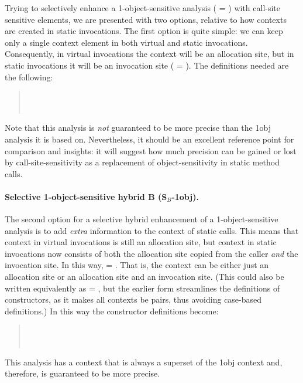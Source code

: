 Trying to selectively enhance a 1-object-sensitive analysis (
= \args{\{$\star$\}}) with call-site sensitive elements, we are
presented with two options, relative to how contexts are created in
static invocations. The first option is quite simple: we can keep only
a single context element in both virtual and static
invocations. Consequently, in virtual invocations the context will be
an allocation site, but in static invocations it will be an invocation
site ( = ). The definitions needed are the
following:
\begin{quote}
 \\
 \\
\end{quote}
Note that this analysis is \emph{not} guaranteed to be more precise
than the 1obj analysis it is based on. Nevertheless, it should be an
excellent reference point for comparison and insights: it will suggest
how much precision can be gained or lost by call-site-sensitivity as a
replacement of object-sensitivity in static method calls.

\paragraph{Selective 1-object-sensitive hybrid B (S$_B$-1obj).}

The second option for a selective hybrid enhancement of a
1-object-sensitive analysis is to add \emph{extra} information to the
context of static calls. This means that context in virtual
invocations is still an allocation site, but context in static
invocations now consists of both the allocation site copied from the
caller \emph{and} the invocation site. In this way,  = . That is, the context can be either
just an allocation site or an allocation site and an invocation
site. (This could also be written equivalently as  = , but the earlier form streamlines the
definitions of constructors, as it makes all contexts be pairs, thus
avoiding case-based definitions.)  In this way the
constructor definitions become:
\begin{quote}
 \\
 \\
\end{quote}
This analysis has a context that is always a superset of the 1obj
context and, therefore, is guaranteed to be more precise.

